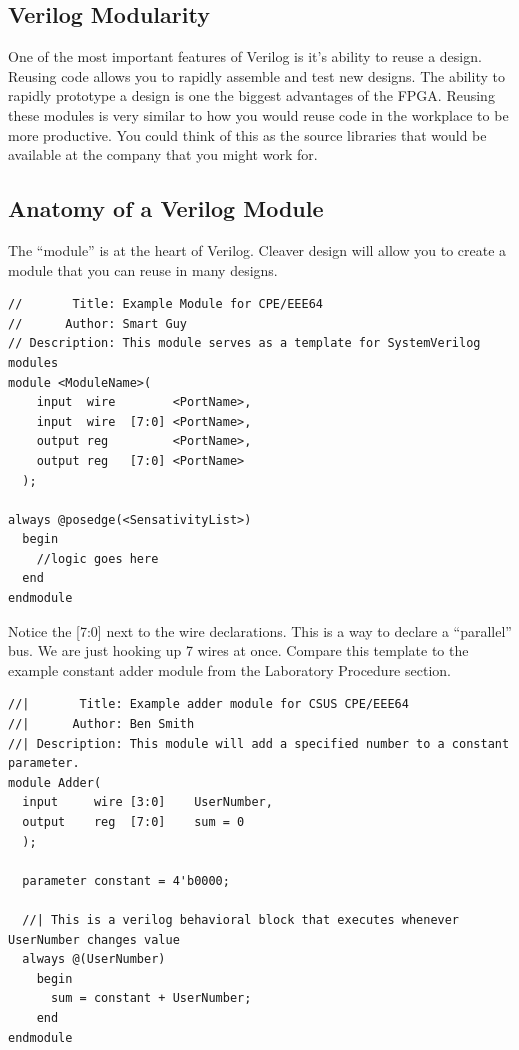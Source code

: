 \documentclass[12pt,journal]{IEEEtran}
\begin{document}
    \subsection{Verilog Modularity}
      One of the most important features of Verilog is it's ability to reuse a design. Reusing code allows you to  rapidly assemble and test new designs. The ability to rapidly prototype a design is one the biggest advantages of the FPGA. Reusing these modules is very similar to how you would reuse code in the workplace to be more productive. You could think of this as the source libraries that would be available at the company that you might work for.

    \subsection{Anatomy of a Verilog Module}
      The ``module'' is at the heart of Verilog. Cleaver design will allow you to create a module that you can reuse in many designs.
      \begin{lstlisting}[caption={Example Module}]
//       Title: Example Module for CPE/EEE64
//      Author: Smart Guy
// Description: This module serves as a template for SystemVerilog modules
module <ModuleName>(
    input  wire        <PortName>,
    input  wire  [7:0] <PortName>,
    output reg         <PortName>,
    output reg   [7:0] <PortName>
  );

always @posedge(<SensativityList>)
  begin
    //logic goes here
  end
endmodule
      \end{lstlisting}
      Notice the [7:0] next to the wire declarations. This is a way to declare a ``parallel'' bus. We are just hooking up 7 wires at once. Compare this template to the example constant adder module from the Laboratory Procedure section.
\begin{lstlisting}
//|       Title: Example adder module for CSUS CPE/EEE64
//|      Author: Ben Smith
//| Description: This module will add a specified number to a constant parameter.
module Adder(
  input     wire [3:0]    UserNumber,
  output    reg  [7:0]    sum = 0
  );

  parameter constant = 4'b0000;

  //| This is a verilog behavioral block that executes whenever UserNumber changes value
  always @(UserNumber)
    begin
      sum = constant + UserNumber;
    end
endmodule
\end{lstlisting}
\end{document}
